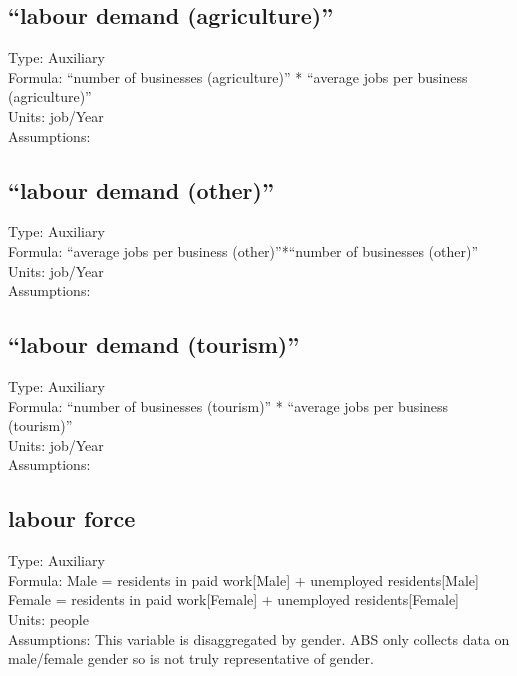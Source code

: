 \documentclass[
  11pt,
]{book}
\begin{document}
\hypertarget{labour-demand-agriculture}{%
\subsection{``labour demand (agriculture)''}\label{labour-demand-agriculture}}

Type: Auxiliary\\
Formula: ``number of businesses (agriculture)'' * ``average jobs per business (agriculture)''\\
Units: job/Year\\
Assumptions:

\hypertarget{labour-demand-other}{%
\subsection{``labour demand (other)''}\label{labour-demand-other}}

Type: Auxiliary\\
Formula: ``average jobs per business (other)''*``number of businesses (other)''\\
Units: job/Year\\
Assumptions:

\hypertarget{labour-demand-tourism}{%
\subsection{``labour demand (tourism)''}\label{labour-demand-tourism}}

Type: Auxiliary\\
Formula: ``number of businesses (tourism)'' * ``average jobs per business (tourism)''\\
Units: job/Year\\
Assumptions:

\hypertarget{labour-force}{%
\subsection{labour force}\label{labour-force}}

Type: Auxiliary\\
Formula: Male = residents in paid work{[}Male{]} + unemployed residents{[}Male{]}\\
Female = residents in paid work{[}Female{]} + unemployed residents{[}Female{]}\\
Units: people\\
Assumptions: This variable is disaggregated by gender. ABS only collects data on male/female gender so is not truly representative of gender.
\end{document}
